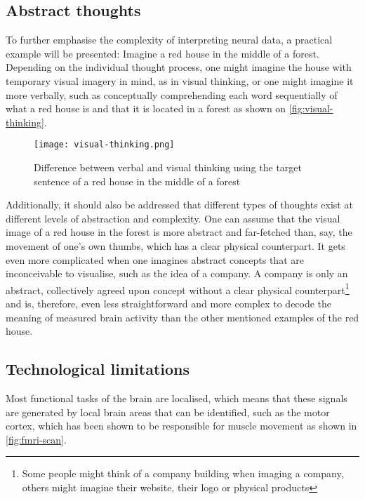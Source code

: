 \subsection{Abstract thoughts}
\label{chapter2-abstract-thoughts}

To further emphasise the complexity of interpreting neural data, a practical example will be presented: Imagine a red house in the middle of a forest. Depending on the individual thought process, one might imagine the house with temporary visual imagery in mind, as in visual thinking, or one might imagine it more verbally, such as conceptually comprehending each word sequentially of what a red house is and that it is located in a forest \citep{amit_asymmetrical_2017} as shown on \autoref{fig:visual-thinking}.

\begin{figure}[ht]
  \centering
  \texttt{[image: visual-thinking.png]}
  \caption{Difference between verbal and visual thinking using the target sentence of a red house in the middle of a forest}
  \label{fig:visual-thinking}
\end{figure}

Additionally, it should also be addressed that different types of thoughts exist at different levels of abstraction and complexity. One can assume that the visual image of a red house in the forest is more abstract and far-fetched than, say, the movement of one's own thumbs, which has a clear physical counterpart. It gets even more complicated when one imagines abstract concepts that are inconceivable to visualise, such as the idea of a company. A company is only an abstract, collectively agreed upon concept without a clear physical counterpart\footnote{Some people might think of a company building when imaging a company, others might imagine their website, their logo or physical products} and is, therefore, even less straightforward and more complex to decode the meaning of measured brain activity than the other mentioned examples of the red house.

\subsection{Technological limitations}
\label{chapter2-technological-limitations}

Most functional tasks of the brain are localised, which means that these signals are generated by local brain areas that can be identified, such as the motor cortex, which has been shown to be responsible for muscle movement as shown in \autoref{fig:fmri-scan}.

